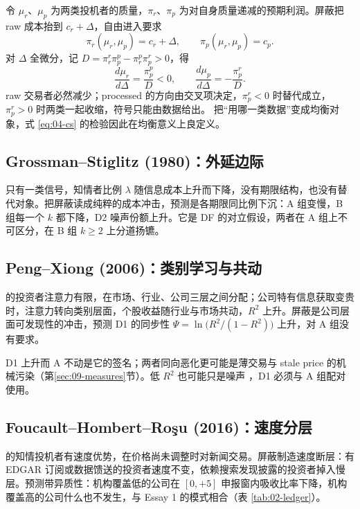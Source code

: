 \documentclass[a4paper,11pt]{ctexart}
\begin{document}
令 $\mu_r$、$\mu_p$ 为两类投机者的质量，$\pi_r$、$\pi_p$ 为对自身质量递减的预期利润。屏蔽把 raw 成本抬到 $c_r+\Delta$，自由进入要求
\begin{equation}\label{eq:04-entry}
\pi_r(\mu_r,\mu_p)=c_r+\Delta,\qquad \pi_p(\mu_r,\mu_p)=c_p .
\end{equation}
对 $\Delta$ 全微分，记 $D=\pi_r^{r}\pi_p^{p}-\pi_r^{p}\pi_p^{r}>0$，得
\begin{equation}\label{eq:04-cs}
\frac{d\mu_r}{d\Delta}=\frac{\pi_p^{p}}{D}<0,\qquad
\frac{d\mu_p}{d\Delta}=-\frac{\pi_p^{r}}{D}.
\end{equation}
raw 交易者必然减少；processed 的方向由交叉项决定，$\pi_p^{r}<0$ 时替代成立，$\pi_p^{r}>0$ 时两类一起收缩，符号只能由数据给出。\citet{dugastfoucault2025} 把“用哪一类数据”变成均衡对象，式 \eqref{eq:04-cs} 的检验因此在均衡意义上良定义。

\subsection{Grossman--Stiglitz (1980)：外延边际}\label{sec:04-gs}

\citet{grossmanstiglitz1980} 只有一类信号，知情者比例 $\lambda$ 随信息成本上升而下降，没有期限结构，也没有替代对象。把屏蔽读成纯粹的成本冲击，预测是各期限同比例下沉：A 组变慢，B 组每一个 $k$ 都下降，D2 噪声份额上升。它是 DF 的对立假设，两者在 A 组上不可区分，在 B 组 $k\ge 2$ 上分道扬镳。

\subsection{Peng--Xiong (2006)：类别学习与共动}\label{sec:04-px}

\citet{pengxiong2006} 的投资者注意力有限，在市场、行业、公司三层之间分配；公司特有信息获取变贵时，注意力转向类别层面，个股收益随行业与市场共动，$R^2$ 上升。屏蔽是公司层面可发现性的冲击，预测 D1 的同步性 $\Psi=\ln\!\bigl(R^2/(1-R^2)\bigr)$ 上升，对 A 组没有要求。

D1 上升而 A 不动是它的签名；两者同向恶化更可能是薄交易与 stale price 的机械污染（第\ref{sec:09-measures}节）。低 $R^2$ 也可能只是噪声 \citep{roll1988,morckyeungyu2000}，D1 必须与 A 组配对使用。

\subsection{Foucault--Hombert--Roşu (2016)：速度分层}\label{sec:04-fhr}

\citet{foucaulthombertrosu2016} 的知情投机者有速度优势，在价格尚未调整时对新闻交易。屏蔽制造速度断层：有 EDGAR 订阅或数据馈送的投资者速度不变，依赖搜索发现披露的投资者掉入慢层。预测带异质性：机构覆盖低的公司在 $[0,+5]$ 申报窗内吸收比率下降，机构覆盖高的公司什么也不发生，与 Essay 1 的模式相合（表 \ref{tab:02-ledger}）。
\end{document}
